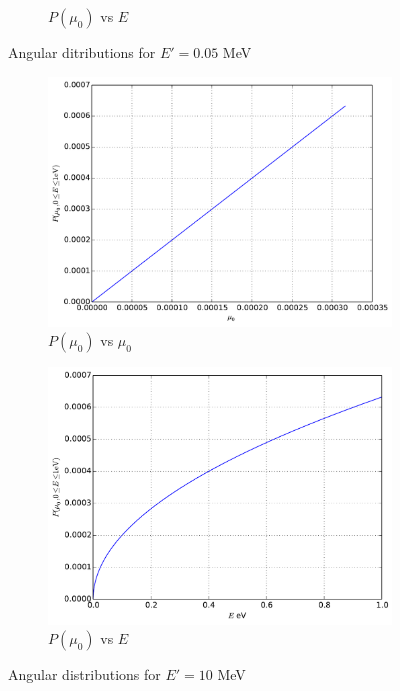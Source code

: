 \documentclass[12pt]{article}
\newenvironment{solution}[1][Solution]{\begin{trivlist}
\item[\hskip \labelsep {\bfseries #1} {\hspace{-0.2em}\bfseries:}]\hspace{0.3in}\newline}{\end{trivlist}}
\begin{document}
\begin{solution}
\begin{figure}[hb]
\begin{subfigure}{0.5\textwidth}
    \caption{$P(\mu_0)$ vs $E$}
\end{subfigure}
    \caption{Angular ditributions for $E'=0.05$ MeV}
\end{figure}
\begin{figure}
\begin{subfigure}{0.5\textwidth}
    \includegraphics[width=\textwidth]{scat_kernel_10.pdf}
    \caption{$P(\mu_0)$ vs $\mu_0$}
\end{subfigure}
\begin{subfigure}{0.5\textwidth}
    \includegraphics[width=\textwidth]{scat_kernel_E_10.pdf}
    \caption{$P(\mu_0)$ vs $E$}
\end{subfigure}
    \caption{Angular distributions for $E'=10$ MeV}
\end{figure}

 




 \end{solution}
\end{document}
